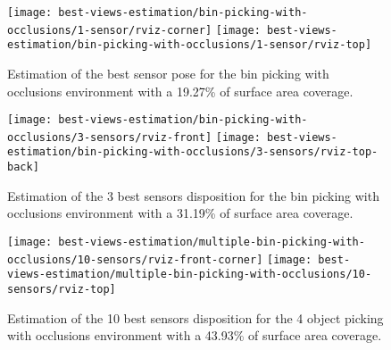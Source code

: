 \begin{figure}
	\centering
	\texttt{[image: best-views-estimation/bin-picking-with-occlusions/1-sensor/rviz-corner]}
	\texttt{[image: best-views-estimation/bin-picking-with-occlusions/1-sensor/rviz-top]}
	\caption{Estimation of the best sensor pose for the bin picking with occlusions environment with a 19.27\% of surface area coverage.}
	\label{fig:bin-picking-with-occlusions-1-sensor}
\end{figure}

\begin{figure}
	\centering
	\texttt{[image: best-views-estimation/bin-picking-with-occlusions/3-sensors/rviz-front]}%
	\texttt{[image: best-views-estimation/bin-picking-with-occlusions/3-sensors/rviz-top-back]}%
	\caption{Estimation of the 3 best sensors disposition for the bin picking with occlusions environment with a 31.19\% of surface area coverage.}
	\label{fig:bin-picking-with-occlusions-3-sensors}
\end{figure}

\begin{figure}
	\centering
	\texttt{[image: best-views-estimation/multiple-bin-picking-with-occlusions/10-sensors/rviz-front-corner]}%
	\texttt{[image: best-views-estimation/multiple-bin-picking-with-occlusions/10-sensors/rviz-top]}
	\caption{Estimation of the 10 best sensors disposition for the 4 object picking with occlusions environment with a 43.93\% of surface area coverage.}
	\label{fig:multiple-bin-picking-with-occlusions-10-sensors}
\end{figure}
